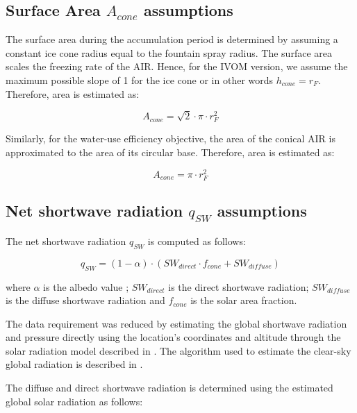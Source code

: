 \subsection{Surface Area $A_{cone}$ assumptions}

The surface area during the accumulation period is determined by assuming a constant ice cone
radius equal to the fountain spray radius. The surface area scales the freezing rate of the AIR. Hence, for the
IVOM version, we assume the maximum possible slope of 1 for the ice cone or in other words $h_{cone} = r_{F}$.
Therefore, area is estimated as:  

\begin{equation} A_{cone} =\sqrt{2} \cdot \pi \cdot r_{F}^2  \end{equation}

Similarly, for the water-use efficiency objective, the area of the conical AIR is approximated to the area of
its circular base. Therefore, area is estimated as:

\begin{equation} A_{cone} =\pi \cdot r_{F}^2  \end{equation}

\subsection{Net shortwave radiation \texorpdfstring{$q_{SW}$}{Lg} assumptions}

The net shortwave radiation $q_{SW}$ is computed as follows:

\begin{equation} 
q_{SW} = (1- \alpha) \cdot ( SW_{direct} \cdot f_{cone} + SW_{diffuse})
\end{equation}

where $\alpha$ is the albedo value ; $SW_{direct}$ is the direct shortwave radiation; $SW_{diffuse}$ is the
diffuse shortwave radiation and $f_{cone}$ is the solar area fraction.

The data requirement was reduced by estimating the global shortwave radiation and pressure directly using the
location's coordinates and altitude through the solar radiation model described in
\citet{holmgrenPvlibPythonPython2018}. The algorithm used to estimate the clear-sky global radiation is
described in \citet{ineichenBroadbandSimplifiedVersion2008}.  

The diffuse and direct shortwave radiation is determined using the estimated global solar radiation as follows:

